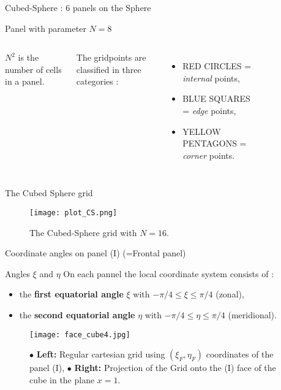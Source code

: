 \documentclass[11pt]{beamer}
\begin{document}
\begin{frame}{Cubed-Sphere : 6 panels on the Sphere}
\begin{block}{Panel with parameter $N=8$}
\begin{columns}
$N^2$ is the number of cells in a panel. 

The gridpoints are classified in three categories :
\begin{itemize}
\item RED CIRCLES = {\sl internal} points,
\item BLUE SQUARES = {\sl edge} points,
\item YELLOW PENTAGONS = {\sl corner} points.
\end{itemize}

\begin{figure}
   \def\svgwidth{1 \textwidth}

\end{figure}
\end{columns}
\end{block}
\end{frame}


\begin{frame}{The Cubed Sphere grid}
\begin{figure}
\begin{center}
\hspace{-1.cm}
\texttt{[image: plot\_CS.png]}
\caption{\footnotesize
The Cubed-Sphere grid with $N=16$.
}
\end{center}
\label{fig:1.4}
\end{figure}
\end{frame}


\begin{frame}{Coordinate angles on panel (I) (=Frontal panel)}
\begin{block}{Angles $\xi$ and $\eta$}
On each pannel the local coordinate system
consists of :
\begin{itemize}
\item the \textbf{first equatorial angle} $\xi$ with $-\pi/4 \leq \xi \leq \pi/4$ (zonal),
\item the \textbf{second equatorial angle} $\eta$ with $-\pi/4 \leq \eta \leq \pi/4$ (meridional).
\end{itemize}

\end{block}
\begin{figure}
\begin{center}
\texttt{[image: face\_cube4.jpg]}
\caption{\footnotesize
$\bullet$ \textbf{Left:} Regular cartesian grid using $(\xi_F,\eta_F)$ coordinates of the panel (I),\newline
$\bullet$ \textbf{Right:} Projection of the Grid onto the (I) face of the cube in the plane $x=1$.
}
\label{fig:1}
\end{center}
\end{figure}
\end{frame}
\end{document}
